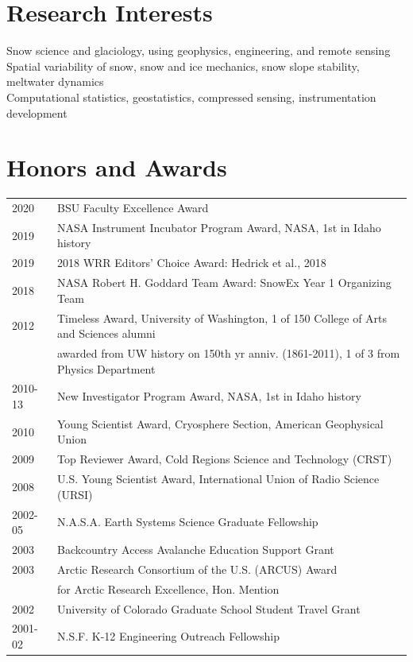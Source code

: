 \documentclass[11pt]{article}
\begin{document}
\section*{Research Interests}
Snow science and glaciology, using geophysics, engineering, and remote sensing \\
Spatial variability of snow, snow and ice mechanics, snow slope stability, meltwater dynamics \\
Computational statistics, geostatistics, compressed sensing, instrumentation development \\



\section*{Honors and Awards}
\begin{tabular}{ll}
2020 & BSU Faculty Excellence Award \\
2019 & NASA Instrument Incubator Program Award, NASA, 1st in Idaho history \\
2019 & 2018 WRR Editors' Choice Award: Hedrick et al., 2018 \\
2018 & NASA Robert H. Goddard Team Award: SnowEx Year 1 Organizing Team \\
2012 & Timeless Award, University of Washington, 1 of 150 College of Arts and Sciences alumni  \\
& awarded from UW history on 150th yr anniv. (1861-2011), 1 of 3 from Physics Department \\
2010-13 & New Investigator Program Award, NASA, 1st in Idaho history \\
2010 & Young Scientist Award, Cryosphere Section, American Geophysical Union \\
2009 & Top Reviewer Award, Cold Regions Science and Technology (CRST) \\
2008 & U.S. Young Scientist Award, International Union of Radio Science (URSI) \\
2002-05 & N.A.S.A. Earth Systems Science Graduate Fellowship \\
2003 & Backcountry Access Avalanche Education Support Grant \\
2003 & Arctic Research Consortium of the U.S. (ARCUS) Award \\
& for Arctic Research Excellence, Hon. Mention \\
2002 & University of Colorado Graduate School Student Travel Grant \\
2001-02 & N.S.F. K-12 Engineering Outreach Fellowship \\

\end{tabular}
\end{document}
